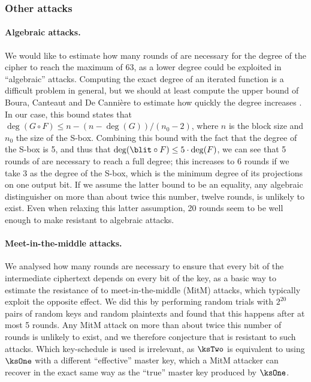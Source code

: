 \subsubsection{Other attacks}

\paragraph{Algebraic attacks.}
We would like to estimate how many rounds of \fly are necessary for the degree of the cipher to reach the maximum of 63, as a lower degree could be exploited in
``algebraic'' attacks. Computing the exact degree of an iterated function is a difficult problem in general, but we should at least compute the upper bound of Boura, Canteaut and De Cannière
to estimate how quickly the degree increases \cite{permdegree}. In our case, this bound states that $\deg(G \circ F) \leq n - (n - \deg(G))/(n_0 - 2)$, where $n$ is the block size and $n_0$ the
size of the S-box. Combining this bound with the fact that the degree of the S-box is 5, and thus that $\deg(\blit \circ F) \leq 5\cdot\deg(F)$, we can see that 5 rounds of
\fly are necessary to reach a full degree; this increases to 6 rounds if we take 3 as the degree of the S-box, which is the minimum degree of its projections on one
output bit. If we assume the latter bound to be an equality, any algebraic distinguisher on more than about twice this number, \ie twelve rounds, is unlikely to exist.
Even when relaxing this latter assumption, 20 rounds seem to be well enough to make \fly resistant to algebraic attacks.

\paragraph{Meet-in-the-middle attacks.}
We analysed how many rounds are necessary to ensure that every bit of the intermediate ciphertext depends on every bit of the key, as a basic way to estimate the resistance
of \fly to meet-in-the-middle (MitM) attacks, which typically exploit the opposite effect. We did this by performing random trials with $2^{20}$ pairs of random
keys and random plaintexts and found that this happens after at most 5 rounds. Any MitM attack on more than about twice this number of rounds is unlikely to exist, and
we therefore conjecture that \fly is resistant to such attacks. Which key-schedule is used is irrelevant, as $\ksTwo$ is equivalent to
using $\ksOne$ with a different ``effective'' master key, which a MitM attacker can recover in the exact same way as the ``true'' master key produced by $\ksOne$.

